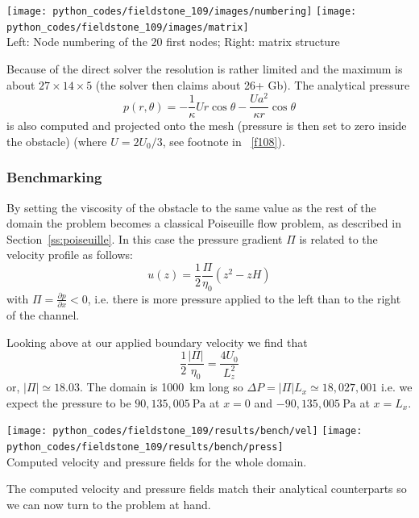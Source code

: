 \begin{center}
\texttt{[image: python\_codes/fieldstone\_109/images/numbering]}
\texttt{[image: python\_codes/fieldstone\_109/images/matrix]}\\
{\captionfont Left: Node numbering of the 20 first nodes; Right: matrix structure}
\end{center}

Because of the direct solver the resolution is rather limited and the maximum is 
about $27\times 14 \times 5$ (the solver then claims about 26+ Gb). The analytical pressure  
\[
p(r,\theta) = 
-\frac{1}{\kappa} U r  \cos \theta
 -\frac{U a^2 }{\kappa r}  \cos \theta
\]
is also computed and projected onto the mesh (pressure is then set to zero inside the 
obstacle) (where $U=2U_0/3$, see footnote in \stone~\ref{f108}). 

\subsubsection*{Benchmarking}

By setting the viscosity of the obstacle to the same value as the rest 
of the domain the problem becomes a classical Poiseuille flow problem, as 
described in Section~\ref{ss:poiseuille}.
In this case the pressure gradient $\Pi$ is related to the velocity profile 
as follows:
\[
u(z) = \frac{1}{2}\frac{\Pi}{\eta_0} (z^2 - zH)
\]
with $\Pi=\frac{\partial p}{\partial x}<0$, i.e. 
there is more pressure applied to the left than to the right of the channel.

Looking above at our applied boundary velocity we find that 
\[
\frac{1}{2}\frac{|\Pi|}{\eta_0} = \frac{4U_0}{L_z^2}
\]
or, $|\Pi|\simeq 18.03$. The domain is 1000~\si{\km} long 
so $\Delta P = |\Pi| L_x \simeq 18,027,001$ i.e. we expect the pressure to 
be $90,135,005~\si{\pascal}$ at $x=0$ and $-90,135,005~\si{\pascal}$ at $x=L_x$. 

\begin{center}
\texttt{[image: python\_codes/fieldstone\_109/results/bench/vel]}
\texttt{[image: python\_codes/fieldstone\_109/results/bench/press]}\\
{\captionfont Computed velocity and pressure fields for the whole domain.}
\end{center}

The computed velocity and pressure fields match their analytical counterparts 
so we can now turn to the problem at hand.

